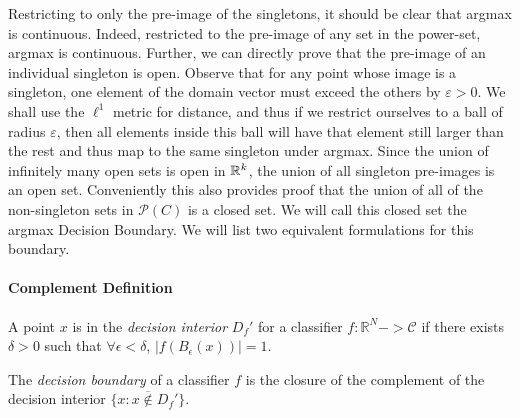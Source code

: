 Restricting to only the pre-image of the singletons, it should be clear that argmax is continuous.  Indeed, restricted to the pre-image of any set in the power-set, argmax is continuous. Further, we can directly prove that the pre-image of an individual singleton is open. Observe that for any point whose image is a singleton, one element of the domain vector must exceed the others by $\varepsilon > 0$. We shall use the $\ell^1$ metric for distance, and thus if we restrict ourselves to a ball of radius $\varepsilon$, then all elements inside this ball will have that element still larger than the rest and thus map to the same singleton under argmax. Since the union of infinitely many open sets is open in $\mathbb{R}^k$, the union of all singleton pre-images is an open set. Conveniently this also provides proof that the union of all of the non-singleton sets in $\mathcal{P}(C)$ is a closed set. We will call this closed set the argmax Decision Boundary. We will list two equivalent formulations for this boundary. 


\paragraph{Complement Definition}

A point $x$ is in the \emph{decision interior} $D_f'$ for a classifier $f: \mathbb{R}^N -> \mathcal{C}$ if there exists $\delta > 0$ such that $\forall \epsilon < \delta$, $|f(B_\epsilon(x))| = 1$. 

The \emph{decision boundary} of a classifier $f$ is the closure of the complement of the decision interior $\overline{\{x : x \notin D_f'\}}$. 




